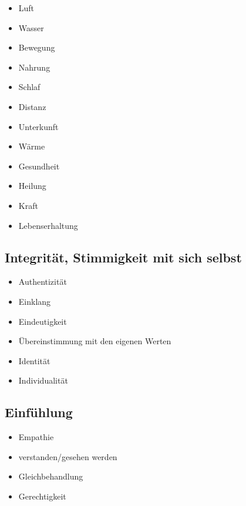 \begin{multicols}{2}
  \begin{itemize}
    \item Luft
    \item Wasser
    \item Bewegung
    \item Nahrung
    \item Schlaf
    \item Distanz
    \item Unterkunft
    \item Wärme
    \item Gesundheit
    \item Heilung
    \item Kraft
    \item Lebenserhaltung
  \end{itemize}
\end{multicols}


\subsection{Integrität, Stimmigkeit mit sich selbst}

\begin{multicols}{2}
  \begin{itemize}
    \item Authentizität
    \item Einklang
    \item Eindeutigkeit
    \item Übereinstimmung mit den eigenen Werten
    \item Identität
    \item Individualität
  \end{itemize}
\end{multicols}


\subsection{Einfühlung}

\begin{multicols}{2}
  \begin{itemize}
    \item Empathie
    \item verstanden/gesehen werden
    \item Gleichbehandlung
    \item Gerechtigkeit
  \end{itemize}
\end{multicols}


